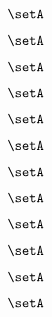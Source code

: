 \begin{forslides}
    \begin{equation}
        \label{eq:slides-translation-115}
        \setA
    \end{equation}

    \begin{equation}
        \label{eq:slides-translation-116}
        \setA
    \end{equation}

    \begin{equation}
        \label{eq:slides-translation-117}
        \setA
    \end{equation}

    \begin{equation}
        \label{eq:slides-translation-118}
        \setA
    \end{equation}

    \begin{equation}
        \label{eq:slides-translation-119}
        \setA
    \end{equation}
    
    \begin{equation}
        \label{eq:slides-translation-120}
        \setA
    \end{equation}

    \begin{equation}
        \label{eq:slides-translation-121}
        \setA
    \end{equation}

    \begin{equation}
        \label{eq:slides-translation-122}
        \setA
    \end{equation}

    \begin{equation}
        \label{eq:slides-translation-123}
        \setA
    \end{equation}

    \begin{equation}
        \label{eq:slides-translation-124}
        \setA
    \end{equation}

    \begin{equation}
        \label{eq:slides-translation-125}
        \setA
    \end{equation}

    \begin{equation}
        \label{eq:slides-translation-126}
        \setA
    \end{equation}


\end{forslides}
